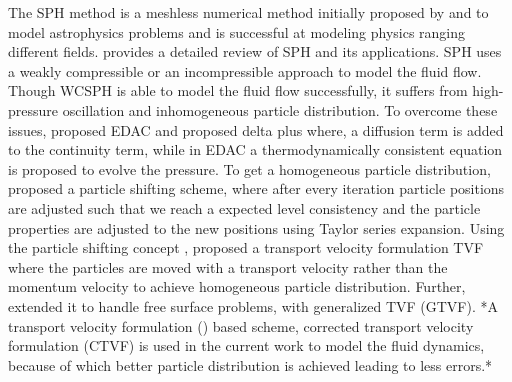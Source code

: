\documentclass[preprint,12pt]{elsarticle}
\begin{document}
The SPH method is a meshless numerical method initially proposed by
\citet{gingold1977smoothed} and \citet{lucy1977numerical} to model
astrophysics problems and is successful at modeling physics ranging different
fields. \citet{monaghan2005smoothed} provides a detailed review of SPH and its
applications. SPH uses a weakly compressible \cite{adepu2021corrected} or an
incompressible approach \cite{cummins_sph_1999} to model the fluid flow.
Though WCSPH is able to model the fluid flow successfully, it suffers from
high-pressure oscillation and inhomogeneous particle distribution. To overcome
these issues, \cite{PRKP:edac-sph-iccm2015} proposed EDAC and
\cite{marrone_-sph_2011} proposed delta plus where, a diffusion term is added
to the continuity term, while in EDAC a thermodynamically consistent equation
is proposed to evolve the pressure. To get a homogeneous particle
distribution, \cite{acc_stab_xu:jcp:2009} proposed a particle shifting scheme,
where after every iteration particle positions are adjusted such that we reach
a expected level consistency and the particle properties are adjusted to the
new positions using Taylor series expansion. Using the particle shifting
concept , \cite{Adami2013} proposed a transport velocity formulation {TVF} where
the particles are moved with a transport velocity rather than the momentum
velocity to achieve homogeneous particle distribution. Further,
\cite{zhang2017generalized} extended it to handle free surface problems, with
generalized TVF (GTVF). *A transport velocity formulation (\cite{Adami2013})
based scheme, corrected transport velocity formulation (CTVF)
\cite{adepu2021corrected} is used in the current work to model the fluid
dynamics, because of which better particle distribution is achieved leading to
less errors.*
\end{document}
